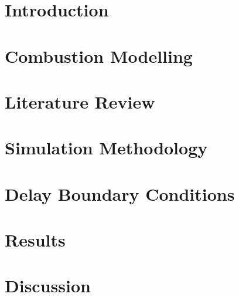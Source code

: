 \documentclass[lmr,second,hyperref,rgb,hyperref,dvipsnames]{uom_thesis_casson}
\title{\xmp@Title}
\author{\xmp@Author}
\begin{document}
\maketitle
\cleardoublepage

% 

\pagestyle{fancy}
\setcounter{page}{5}

\thispagestyle{empty}
\cleardoublepage

\uomtoc
\cleardoublepage

\uomstartmainbody

\chapter{Introduction} \label{ch:intro}
% 
\cleardoublepage

\chapter{Combustion Modelling} \label{ch:combust-model}
% 
\cleardoublepage

\chapter{Literature Review} \label{ch:lit-review}
% 
\cleardoublepage

\chapter{Simulation Methodology} \label{ch:dns-methods}
% 
\cleardoublepage

\chapter{Delay Boundary Conditions} \label{ch:delay-bcs}

\cleardoublepage

\chapter{Results} \label{ch:results}

\cleardoublepage

\chapter{Discussion} \label{ch:discuss}
% 
\cleardoublepage

\printbibliography[title={References}, heading=bibintoc]
\end{document}
